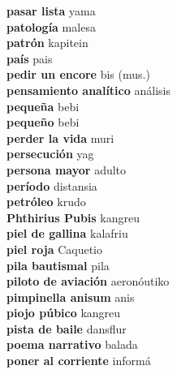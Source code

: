 \textbf{ pasar lista  } yama \\
\textbf{ patología  } malesa \\
\textbf{ patrón  } kapitein \\
\textbf{ país  } pais \\
\textbf{ pedir un encore  } bis (mus.) \\
\textbf{ pensamiento analítico  } análisis \\
\textbf{ pequeña  } bebi \\
\textbf{ pequeño  } bebi \\
\textbf{ perder la vida  } muri \\
\textbf{ persecución  } yag \\
\textbf{ persona mayor  } adulto \\
\textbf{ período  } distansia \\
\textbf{ petróleo  } krudo \\
\textbf{ Phthirius Pubis  } kangreu \\
\textbf{ piel de gallina  } kalafriu \\
\textbf{ piel roja  } Caquetio \\
\textbf{ pila bautismal  } pila \\
\textbf{ piloto de aviación  } aeronóutiko \\
\textbf{ pimpinella anisum  } anis \\
\textbf{ piojo púbico  } kangreu \\
\textbf{ pista de baile  } dansflur \\
\textbf{ poema narrativo  } balada \\
\textbf{ poner al corriente  } informá \\
